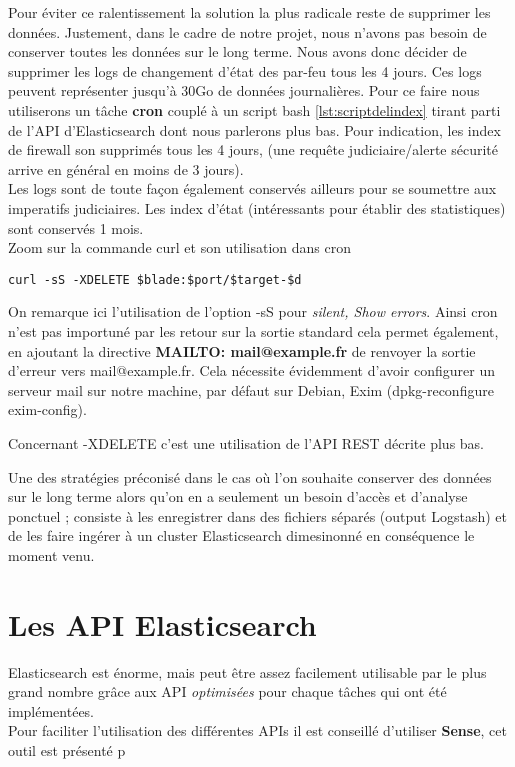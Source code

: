 {Pour éviter ce ralentissement la solution la plus radicale reste de supprimer les 
données. Justement, dans le cadre de notre projet, nous n'avons pas besoin de conserver 
toutes les données sur le long terme. Nous avons donc décider de supprimer les logs 
de changement d'état des par-feu tous les 4 jours. Ces logs peuvent représenter 
jusqu'à 30Go de données journalières. 
Pour ce faire nous utiliserons un tâche \textbf{cron} couplé à un script bash 
\ref{lst:scriptdelindex} tirant parti de l'API d'Elasticsearch dont nous parlerons 
plus bas. Pour indication, les index de firewall son supprimés tous les 4 jours, 
(une requête judiciaire/alerte sécurité arrive en général en moins de 3 jours).\\ 
Les logs sont de toute façon également conservés ailleurs pour se soumettre aux 
imperatifs judiciaires. Les index d'état (intéressants pour établir des statistiques)
sont conservés 1 mois.\\[2mm]
Zoom sur la commande curl et son utilisation dans cron

\begin{lstlisting}[style=code,label={lst:curlexemple},caption={Extrait de notre script \ref{lst:scriptdelindex}}]
curl -sS -XDELETE $blade:$port/$target-$d
\end{lstlisting}

On remarque ici l'utilisation de l'option -sS pour \textit{silent, Show errors}.
Ainsi cron n'est pas importuné par les retour sur la sortie standard cela permet
également, en ajoutant la directive \textbf{MAILTO: mail@example.fr} de renvoyer
la sortie d'erreur vers mail@example.fr. Cela nécessite évidemment d'avoir configurer
un serveur mail sur notre machine, par défaut sur Debian, Exim (dpkg-reconfigure 
exim-config).

Concernant -XDELETE c'est une utilisation de l'API REST décrite plus bas.

Une des stratégies préconisé dans le cas où l'on souhaite conserver des données sur
le long terme alors qu'on en a seulement un besoin d'accès et d'analyse ponctuel ;
consiste à les enregistrer dans des fichiers séparés (output Logstash) et de les 
faire ingérer à un cluster Elasticsearch dimesinonné en conséquence le moment venu.


\section{Les API Elasticsearch}
Elasticsearch est énorme, mais peut être assez facilement utilisable par le 
plus grand nombre grâce aux \gls{API} \emph{optimisées} pour chaque tâches qui ont été implémentées.\\[2mm]
Pour faciliter l'utilisation des différentes APIs il est conseillé d'utiliser \textbf{Sense},
cet outil est présenté p\pageref{subsec:elasticsense}


}
